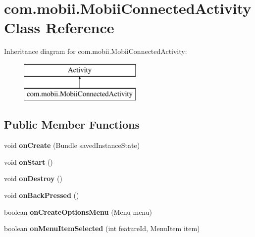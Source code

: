\hypertarget{classcom_1_1mobii_1_1_mobii_connected_activity}{\section{com.\-mobii.\-Mobii\-Connected\-Activity Class Reference}
\label{classcom_1_1mobii_1_1_mobii_connected_activity}
}
Inheritance diagram for com.\-mobii.\-Mobii\-Connected\-Activity\-:\begin{figure}[H]
\begin{center}
\leavevmode
\includegraphics[height=2.000000cm]{classcom_1_1mobii_1_1_mobii_connected_activity}
\end{center}
\end{figure}
\subsection*{Public Member Functions}
\begin{DoxyCompactItemize}
\item 
\hypertarget{classcom_1_1mobii_1_1_mobii_connected_activity_a655f1cee52c510d2ccd14df064b1147b}{void {\bfseries on\-Create} (Bundle saved\-Instance\-State)}\label{classcom_1_1mobii_1_1_mobii_connected_activity_a655f1cee52c510d2ccd14df064b1147b}

\item 
\hypertarget{classcom_1_1mobii_1_1_mobii_connected_activity_a2e5c0d5dfd6ff4238aaef3d0b5293ce4}{void {\bfseries on\-Start} ()}\label{classcom_1_1mobii_1_1_mobii_connected_activity_a2e5c0d5dfd6ff4238aaef3d0b5293ce4}

\item 
\hypertarget{classcom_1_1mobii_1_1_mobii_connected_activity_a0906522cab0010d39cd11f2178976afd}{void {\bfseries on\-Destroy} ()}\label{classcom_1_1mobii_1_1_mobii_connected_activity_a0906522cab0010d39cd11f2178976afd}

\item 
\hypertarget{classcom_1_1mobii_1_1_mobii_connected_activity_ab6f115cb9ffade180b6d1ba5b1fbca84}{void {\bfseries on\-Back\-Pressed} ()}\label{classcom_1_1mobii_1_1_mobii_connected_activity_ab6f115cb9ffade180b6d1ba5b1fbca84}

\item 
\hypertarget{classcom_1_1mobii_1_1_mobii_connected_activity_aebaa65cf0cc02bbd773d3d6d4c72bc17}{boolean {\bfseries on\-Create\-Options\-Menu} (Menu menu)}\label{classcom_1_1mobii_1_1_mobii_connected_activity_aebaa65cf0cc02bbd773d3d6d4c72bc17}

\item 
\hypertarget{classcom_1_1mobii_1_1_mobii_connected_activity_ab32d82bbbf86ff9fe3a81c0c574a3c4f}{boolean {\bfseries on\-Menu\-Item\-Selected} (int feature\-Id, Menu\-Item item)}\label{classcom_1_1mobii_1_1_mobii_connected_activity_ab32d82bbbf86ff9fe3a81c0c574a3c4f}

\end{DoxyCompactItemize}
